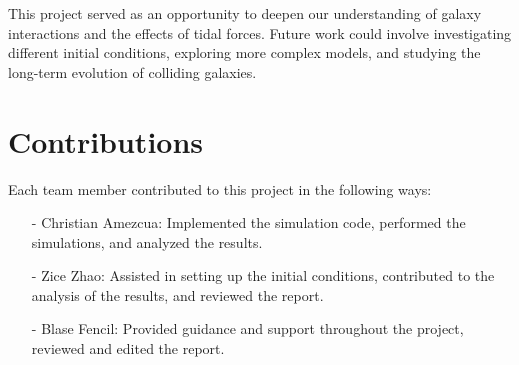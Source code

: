 \documentclass[reprint, amsmath, amssymb, aps]{revtex4-2}
\begin{document}
This project served as an opportunity to deepen our understanding of galaxy interactions and the effects of tidal forces. Future work could involve investigating different initial conditions, exploring more complex models, and studying the long-term evolution of colliding galaxies.

\section{Contributions}

Each team member contributed to this project in the following ways:
\begin{itemize}
    \item[-] Christian Amezcua: Implemented the simulation code, performed the simulations, and analyzed the results.
    \item[-] Zice Zhao: Assisted in setting up the initial conditions, contributed to the analysis of the results, and reviewed the report.
    \item[-] Blase Fencil: Provided guidance and support throughout the project, reviewed and edited the report.
\end{itemize}

\appendix


\end{document}
